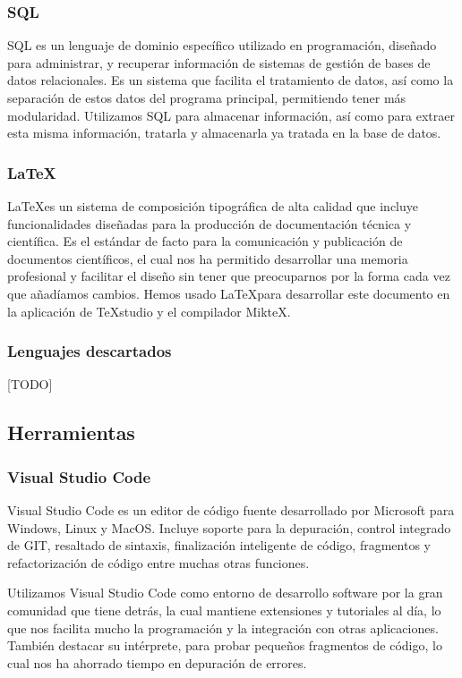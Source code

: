 \subsubsection*{SQL}
SQL es un lenguaje de dominio específico utilizado en programación, diseñado para administrar, y recuperar información de sistemas de gestión de bases de datos relacionales. Es un sistema que facilita el tratamiento de datos, así como la separación de estos datos del programa principal, permitiendo tener más modularidad.
Utilizamos SQL para almacenar información, así como para extraer esta misma información, tratarla y almacenarla ya tratada en la base de datos. 

\subsubsection*{\LaTeX} \label{latexDef}
\LaTeX\space es un sistema de composición tipográfica de alta calidad que incluye funcionalidades diseñadas para la producción de documentación técnica y científica. Es el estándar de facto para la comunicación y publicación de documentos científicos, el cual nos ha permitido desarrollar una memoria profesional y facilitar el diseño sin tener que preocuparnos por la forma cada vez que añadíamos cambios.       
Hemos usado \LaTeX\space para desarrollar este documento en la aplicación de TeXstudio y el compilador MikteX.

\subsubsection{Lenguajes descartados} 

[TODO]

\subsection{Herramientas} 

\subsubsection*{Visual Studio Code}
Visual Studio Code es un editor de código fuente desarrollado por Microsoft para Windows, Linux y MacOS. Incluye soporte para la depuración, control integrado de GIT, resaltado de sintaxis, finalización inteligente de código, fragmentos y refactorización de código entre muchas otras funciones. 

Utilizamos Visual Studio Code como entorno de desarrollo software por la gran comunidad que tiene detrás, la cual mantiene extensiones y tutoriales al día, lo que nos facilita mucho la programación y la integración con otras aplicaciones. También destacar su intérprete, para probar pequeños fragmentos de código, lo cual nos ha ahorrado tiempo en depuración de errores.

